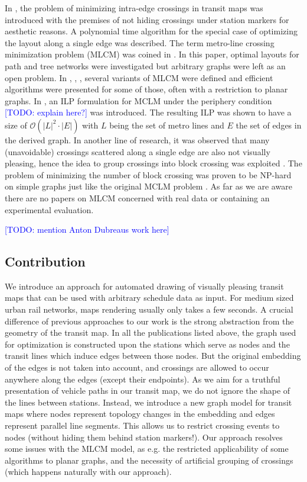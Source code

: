 \documentclass{llncs}
\newcommand\todo[1]{\textcolor{blue}{[TODO: #1]}}
\begin{document}
In \cite{ben06}, the problem of minimizing intra-edge crossings in transit maps was introduced with the premises of not hiding crossings under station markers for aesthetic reasons. A polynomial time algorithm for the special case of optimizing the layout along a single edge was described. The term metro-line crossing minimization problem (MLCM) was coined in \cite{bek07}. In this paper, optimal layouts for path and tree networks were investigated but arbitrary graphs were left as an open problem. In \cite{arg08}, \cite{nol09}, \cite{arg10}, several variants of MLCM were defined and efficient algorithms were presented for some of those, often with a restriction to planar graphs. In \cite{asq08}, an ILP formulation for MCLM under the periphery condition \todo{explain here?} was introduced. The resulting ILP was shown to have a size of $\mathcal{O}(|L|^2 \cdot |E|)$ with $L$ being the set of metro lines and $E$ the set of edges in the derived graph. In another line of research, it was observed that many (unavoidable) crossings scattered along a single edge are also not visually pleasing, hence the idea to group crossings into block crossing was exploited \cite{fin13b}. The problem of minimizing the number of block crossing was proven to be NP-hard on simple graphs just like the original MCLM problem \cite{fin13a}. As far as we are aware there are no papers on MLCM concerned with real data or containing an experimental evaluation.

\todo{mention Anton Dubreaus work here}

%
\subsection{Contribution}\label{SEC:contrib}
%

We introduce an approach for automated drawing of visually pleasing transit maps that can be used with arbitrary schedule data as input. For medium sized urban rail networks, maps rendering usually only takes a few seconds. A crucial difference of previous approaches to our work is the strong abstraction from the geometry of the transit map. In all the publications listed above, the graph used for optimization is constructed upon the stations which serve as nodes and the transit lines which induce edges between those nodes. But the original embedding of the edges is not taken into account, and crossings are allowed to occur anywhere along the edges (except their endpoints). As we aim for a truthful presentation of vehicle paths in our transit map, we do not ignore the shape of the lines between stations. Instead, we introduce a new graph model for transit maps where nodes represent topology changes in the embedding and edges represent parallel line segments. This allows us to restrict crossing events to nodes (without hiding them behind station markers!). Our approach resolves some issues with the MLCM model, as e.g. the restricted applicability of some algorithms to planar graphs, and the necessity of artificial grouping of crossings (which happens naturally with our approach).
\end{document}
